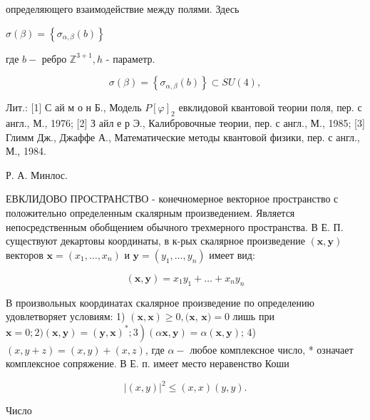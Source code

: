 \documentclass[10pt]{article}
\begin{document}
определяющего взаимодействие между полями. Здесь



$\sigma(\beta)=\left\{\sigma_{\alpha, \beta}(b)\right\}$

где $b-$ ребро $\mathbb{Z}^{3+1}, h$ - параметр.



\[

\sigma(\beta)=\left\{\sigma_{\alpha, \beta}(b)\right\} \subset S U(4),

\]



Лит.: [1] С ай м о н Б., Модель $P[\varphi]_{2}$ евклидовой квантовой теории поля, пер. с англ., М., 1976; [2] З айл е р Э., Калибровочные теории, пер. с англ., М., 1985; [3] Глимм Дж., Джаффе А., Математические методы квантовой физики, пер. с англ., М., 1984.



Р. А. Минлос.



ЕВКЛИДОВО ПРОСТРАНСТВО - конечномерное векторное пространство с положительно определенным скалярным произведением. Является непосредственным обобщением обычного трехмерного пространства. В Е. П. существуют декартовы координаты, в к-рых скалярное произведение $(\boldsymbol{x}, \boldsymbol{y})$ векторов $\boldsymbol{x}=\left(x_{1}, \ldots, x_{n}\right)$ и $\boldsymbol{y}=\left(y_{1}, \ldots, y_{n}\right)$ имеет вид:



\[

(\boldsymbol{x}, \boldsymbol{y})=x_{1} y_{1}+\ldots+x_{n} y_{n}

\]



В произвольных координатах скалярное произведение по определению удовлетворяет условиям: 1) $(\boldsymbol{x}, \boldsymbol{x}) \geqslant 0,(\boldsymbol{x}$, $\boldsymbol{x})=0$ лишь при $\left.\boldsymbol{x}=0 ; 2)(\boldsymbol{x}, \boldsymbol{y})=(\boldsymbol{y}, \boldsymbol{x})^{*} ; 3\right)(\alpha \boldsymbol{x}, \boldsymbol{y})=\alpha(\boldsymbol{x}, \boldsymbol{y})$; 4) $(x, y+z)=(x, y)+(x, z)$, где $\alpha-$ любое комплексное число, * означает комплексное сопряжение. В Е. п. имеет место неравенство Коши



\[

|(x, y)|^{2} \leqslant(x, x)(y, y) .

\]



Число
\end{document}
